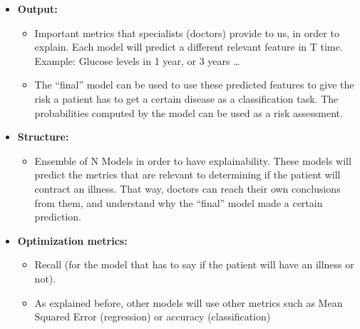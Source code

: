 \begin{itemize}
    \item \textbf{Output:}
    \begin{itemize}
        \item Important metrics that specialists (doctors) provide to us, in order to explain.
        Each model will predict a different relevant feature in T time.
        Example: Glucose levels in 1 year, or 3 years \dots
        \item The “final” model can be used to use these predicted features to give the risk a patient has to get a certain disease as a classification task.
        The probabilities computed by the model can be used as a risk assessment.
    \end{itemize}

    \item \textbf{Structure:}
    \begin{itemize}
        \item Ensemble of N Models in order to have explainability.
        These models will predict the metrics that are relevant to determining if the patient will contract an illness.
        That way, doctors can reach their own conclusions from them, and understand why the “final” model made a certain prediction.
    \end{itemize}

    \item \textbf{Optimization metrics:}
    \begin{itemize}
        \item Recall (for the model that has to say if the patient will have an illness or not).
        \item As explained before, other models will use other metrics such as Mean Squared Error (regression) or accuracy (classification)
    \end{itemize}
\end{itemize}



